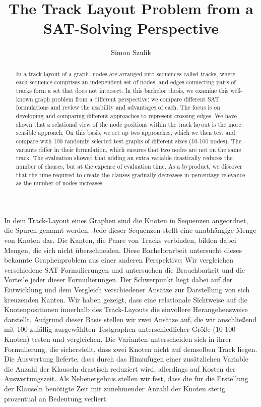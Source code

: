 \documentclass[bachelor, english]{algothesis}
\title{The Track Layout Problem from a SAT-Solving Perspective} %
\author{Simon Szulik} %
\begin{document}
\begin{abstract}
In a track layout of a graph, nodes are arranged into sequences called tracks, where each sequence comprises an independent set of nodes, and edges connecting pairs of tracks form a set that does not intersect. In this bachelor thesis, we examine this well-known graph problem from a different perspective: we compare different SAT formulations and review the usability and advantages of each. The focus is on developing and comparing different approaches to represent crossing edges. We have shown that a relational view of the node positions within the track layout is the more sensible approach. On this basis, we set up two approaches, which we then test and compare with 100 randomly selected test graphs of different sizes (10-100 nodes). The variants differ in their formulation, which ensures that two nodes are not on the same track. The evaluation showed that adding an extra variable drastically reduces the number of clauses, but at the expense of evaluation time. As a byproduct, we discover that the time required to create the clauses gradually decreases in percentage relevance as the number of nodes increases.
\end{abstract}

\begin{germanabstract}
In dem Track-Layout eines Graphen sind die Knoten in Sequenzen angeordnet, die Spuren genannt werden. Jede dieser Sequenzen stellt eine unabhängige Menge von Knoten dar. Die Kanten, die Paare von Tracks verbinden, bilden dabei Mengen, die sich nicht überschneiden. Diese Bachelorarbeit untersucht dieses bekannte Graphenproblem aus einer anderen Perspektive: Wir vergleichen verschiedene SAT-Formulierungen und untersuchen die Brauchbarkeit und die Vorteile jeder dieser Formulierungen. Der Schwerpunkt liegt dabei auf der Entwicklung und dem Vergleich verschiedener Ansätze zur Darstellung von sich kreuzenden Kanten. Wir haben gezeigt, dass eine relationale Sichtweise auf die Knotenpositionen innerhalb des Track-Layouts die sinvollere Herangehensweise darstellt. Aufgrund dieser Basis stellen wir zwei Ansätze auf, die wir anschließend mit 100 zufällig ausgewählten Testgraphen unterschiedlicher Größe (10-100 Knoten) testen und vergleichen. Die Varianten unterscheiden sich in ihrer Formulierung, die sicherstellt, dass zwei Knoten nicht auf demselben Track liegen. Die Auswertung lieferte, dass durch das Hinzufügen einer zusätzlichen Variable die Anzahl der Klauseln drastisch reduziert wird, allerdings auf Kosten der Auswertungszeit. Als Nebenergebnis stellen wir fest, dass die für die Erstellung der Klauseln benötigte Zeit mit zunehmender Anzahl der Knoten stetig prozentual an Bedeutung verliert. 
\end{germanabstract}
\end{document}
